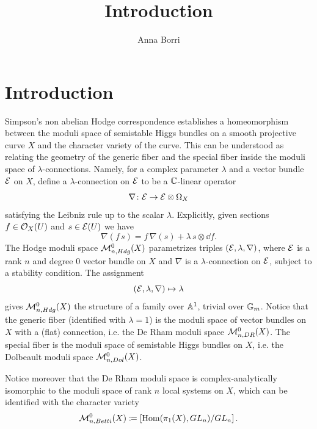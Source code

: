 \documentclass{article}
\title{Introduction}
\author{Anna Borri}
\begin{document}
\section*{Introduction}
Simpson's non abelian Hodge correspondence establishes a homeomorphism between the moduli space of semistable Higgs bundles on a smooth projective curve $X$ and the character variety of the curve. This can be understood as relating the geometry of the generic fiber and the special fiber inside the moduli space of $\lambda$-connections.
Namely, for a complex parameter $\lambda$ and a vector bundle $\mathcal{E}$ on $X$, define a $\lambda$-connection on $\mathcal{E}$ to be a $\mathbb{C}$-linear operator
\begin{equation}
\nabla \colon \mathcal{E} \to \mathcal{E}\otimes \Omega_X
\end{equation}
satisfying the Leibniz rule up to the scalar $\lambda$. Explicitly, given sections $f \in \mathcal{O}_X(U)$ and $s \in \mathcal{E}(U)$ we have
\begin{equation}
\nabla(f \, s) = f \, \nabla(s) + \lambda \, s \otimes \dd f.
\end{equation}
The Hodge moduli space $\mathcal{M}_{n, Hdg}^0(X)$ parametrizes triples $(\mathcal{E}, \lambda, \nabla)$, where $\mathcal{E}$ is a rank $n$ and degree $0$ vector bundle on $X$ and $\nabla$ is a $\lambda$-connection on $\mathcal{E}$, subject to a stability condition.
The assignment
\begin{equation}
(\mathcal{E}, \lambda, \nabla) \mapsto \lambda
\end{equation}
gives $\mathcal{M}_{n, Hdg}^0(X)$ the structure of a family over $\mathbb{A}^1$, trivial over $\mathbb{G}_m$.
Notice that the generic fiber (identified with $\lambda = 1$) is the moduli space of vector bundles on $X$ with a (flat) connection, i.e. the De Rham moduli space $\mathcal{M}_{n, DR}^0(X)$. The special fiber is the moduli space of semistable Higgs bundles on $X$, i.e. the Dolbeault moduli space $\mathcal{M}_{n, Dol}^0(X)$.

Notice moreover that the De Rham moduli space is complex-analytically isomorphic to the moduli space of rank $n$ local systems on $X$, which can be identified with the character variety
\begin{equation}
\mathcal{M}_{n, Betti}^0(X) \coloneqq \left[ \operatorname{Hom}(\pi_1(X), GL_n) / GL_n \right].
\end{equation}
\end{document}
